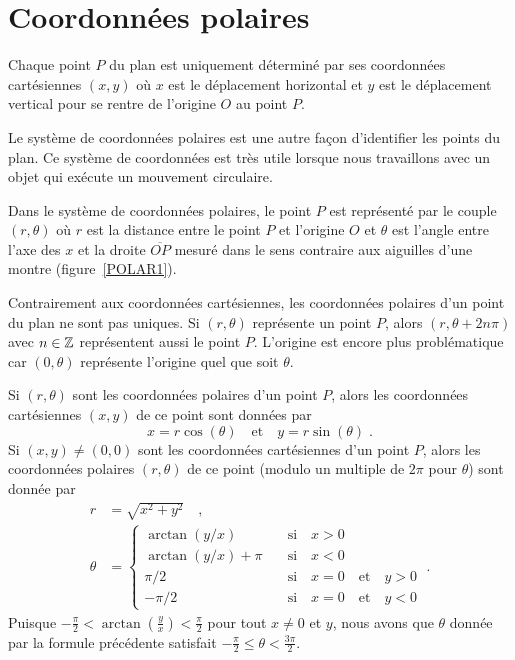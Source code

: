 {\section{Coordonnées polaires \theory}

Chaque point $P$ du plan est uniquement déterminé par ses coordonnées
cartésiennes $(x,y)$ où $x$ est le déplacement horizontal et $y$ est
le déplacement vertical pour se rentre de l'origine $O$ au point $P$.

Le système de coordonnées polaires est une autre façon d'identifier
les points du plan.  Ce système de coordonnées est très utile lorsque
nous travaillons avec un objet qui exécute un mouvement circulaire.

Dans le système de coordonnées polaires, le point $P$ est représenté
par le couple $(r, \theta)$ où $r$ est la distance entre le point $P$
et l'origine $O$ et $\theta$ est l'angle entre l'axe des $x$ et la
droite $\overline{OP}$ mesuré dans le sens contraire aux aiguilles
d'une montre (figure~\ref{POLAR1}).


Contrairement aux coordonnées cartésiennes, les coordonnées polaires
d'un point du plan ne sont pas uniques.  Si $(r,\theta)$ représente un
point $P$, alors $(r,\theta+2n\pi)$ avec $n\in \mathbb{Z}$ représentent aussi
le point $P$. L'origine est encore plus problématique car $(0,\theta)$
représente l'origine quel que soit $\theta$.

Si $(r,\theta)$ sont les coordonnées polaires d'un point $P$, alors
les coordonnées cartésiennes $(x,y)$ de ce point sont données par
\[
x = r\cos(\theta) \quad \text{et} \quad y = r\sin(\theta) \; .
\]
Si $(x,y) \neq (0,0)$ sont les coordonnées cartésiennes d'un point
$P$, alors les coordonnées polaires $(r,\theta)$ de ce point (modulo
un multiple de $2\pi$ pour $\theta$) sont donnée par
\begin{align*}
r &= \sqrt{x^2+y^2} \quad ,\\
\theta &= \begin{cases}
\arctan\left(y/x\right) & \quad \text{si} \quad x>0 \\
\arctan\left(y/x\right) + \pi & \quad \text{si} \quad x<0 \\
\pi/2 & \quad \text{si} \quad x=0 \quad \text{et} \quad y>0 \\
-\pi/2 & \quad \text{si} \quad x=0 \quad \text{et} \quad y<0
\end{cases}\; .
\end{align*}
Puisque
$\displaystyle -\frac{\pi}{2} < \arctan\left(\frac{y}{x}\right) <
\frac{\pi}{2}$ pour tout $x\neq 0$ et $y$, nous avons que $\theta$ donnée
par la formule précédente satisfait
$\displaystyle -\frac{\pi}{2} \leq \theta < \frac{3\pi}{2}$.

}
